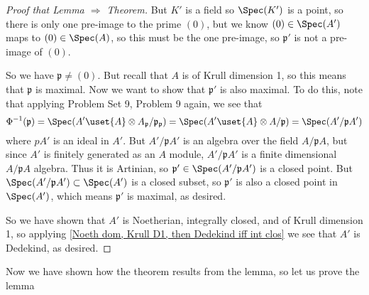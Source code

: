 \documentclass[12 pt]{article}
\theoremstyle{definition}
\newcommand\fp{{\mathfrak p}}
\begin{document}
\begin{proof}[Proof that Lemma $\Rightarrow$ Theorem]
But $K'$ is a field so $\Spec(K')$ is a point, so there is only one pre-image to the prime $(0)$, but we know $(0) \in \Spec(A')$ maps to $(0) \in \Spec(A)$, so this must be the one pre-image, so $\fp'$ is not a pre-image of $(0)$.

So we have $\fp \neq (0)$. But recall that $A$ is of Krull dimension 1, so this means that $\fp$ is maximal. Now we want to show that $\fp'$ is also maximal.  To do this, note that applying Problem Set 9, Problem 9 again, we see that \[\Phi^{-1}(\fp)=\Spec(A' \uset{A}\otimes A_{\fp}/\fp_{\fp})=\Spec(A' \uset{A}\otimes A/\fp)=\Spec(A'/\fp A')\]
where $pA'$ is an ideal in $A'$. But $A'/\fp A'$ is an algebra over the field $A/\fp A$, but since $A'$ is finitely generated as an $A$ module, $A'/\fp A'$ is a finite dimensional $A/\fp A$ algebra. Thus it is Artinian, so $\fp' \in \Spec(A'/\fp A')$ is a closed point. But $\Spec(A'/\fp A') \subset \Spec(A')$ is a closed subset, so $\fp'$ is also a closed point in $\Spec(A')$, which means $\fp'$ is maximal, as desired.

So we have shown that $A'$ is Noetherian, integrally closed, and of Krull dimension 1, so applying
\ref{Noeth dom, Krull D1, then Dedekind iff int clos} we see that $A'$ is Dedekind, as desired.
\end{proof}

Now we have shown how the theorem results from the lemma, so let us prove the lemma
\end{document}
